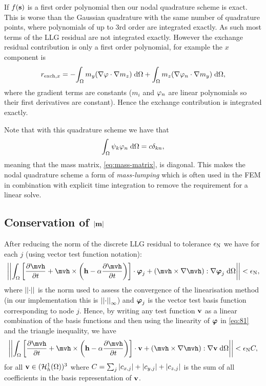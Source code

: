 If $f({\boldsymbol{\mathrm{s}}})$ is a first order polynomial then our nodal quadrature scheme is exact.
This is worse than the Gaussian quadrature with the same number of quadrature points, where polynomials of up to 3rd order are integrated exactly.
As such most terms of the LLG residual are not integrated exactly.
However the exchange residual contribution is only a first order polynomial, for example the $x$ component is
\begin{equation}
  \begin{aligned}
    r_{\text{exch},x} = - {\int_{\Omega} { m_y {\left( \nabla \varphi \cdot \nabla m_z \right)}} {\; \mathrm{{d}}} {\Omega}} + {\int_{\Omega} { m_z {\left( \nabla \varphi_n \cdot \nabla m_y \right)}} {\; \mathrm{{d}}} {\Omega}},
  \end{aligned}
\end{equation}
where the gradient terms are constants ($m_i$ and $\varphi_n$ are linear polynomials so their first derivatives are constant).
Hence the exchange contribution is integrated exactly.

Note that with this quadrature scheme we have that
\begin{equation}
  {\int_{\Omega} {\psi_k \varphi_n} {\; \mathrm{{d}}}{\Omega}} = c \delta_{kn},
\end{equation}
meaning that the mass matrix, \cref{eq:mass-matrix}, is diagonal.
This makes the nodal quadrature scheme a form of \emph{mass-lumping} which is often used in the FEM in combination with explicit time integration to remove the requirement for a linear solve.

\subsection{Conservation of $\left|{\boldsymbol{\mathrm{m}}} \right|$}
\label{sec:weak-cons-absmv}

After reducing the norm of the discrete LLG residual to tolerance $\epsilon_{\mathrm{N}}$ we have for each $j$ (using vector test function notation):
\begin{equation}
  \norm{\intd{ \bigs{\dmdth  + \mvh \times \bigb{\hv - \dampc \dmdth}} \cdot \tbfv_j + \bigb{\mvh \times \grad \mvh} : \grad \tbfv_j}} < \ntol,
  \label{eq:81}
\end{equation}
where $\left| \left| \cdot \right| \right|$ is the norm used to assess the convergence of the linearisation method (in our implementation this is $\left| \left| \cdot \right| \right|_\infty$) and $\boldsymbol{\mathrm{\varphi}}_j$ is the vector test basis function corresponding to node $j$.
Hence, by writing any test function $\boldsymbol{\mathrm{v}}$ as a linear combination of the basis functions and then using the linearity of $\boldsymbol{\mathrm{\varphi}}$ in \cref{eq:81} and the triangle inequality, we have
\begin{equation}
  \norm{\intd{ \bigs{\dmdth + \mvh \times \bigb{\hv - \dampc \dmdth}} \cdot \testv + \bigb{\mvh \times \grad \mvh} : \grad \testv}} < \ntol  \sumbasiscoeff,
  \label{eq:82}
\end{equation}
for all $\boldsymbol{\mathrm{v}} \in ({\mathcal{H}^1_h(\Omega)})^3$ where $C = \sum_j  \left|{c_{x,j}} \right| + \left|{c_{y,j}} \right| + \left|{c_{z,j}} \right|$ is the sum of all coefficients in the basis representation of $\boldsymbol{\mathrm{v}}$.

